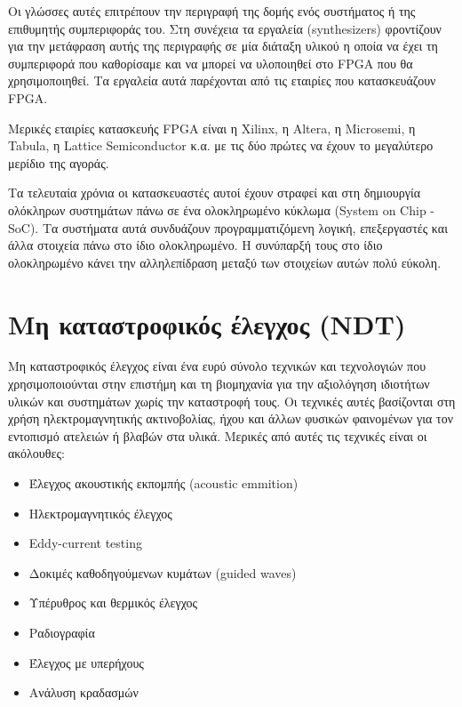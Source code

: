 \documentclass[12pt,a4paper]{book}
\begin{document}
Οι γλώσσες αυτές επιτρέπουν την περιγραφή της δομής ενός συστήματος ή της επιθυμητής συμπεριφοράς του. Στη συνέχεια τα εργαλεία (synthesizers) φροντίζουν για την μετάφραση αυτής της περιγραφής σε μία διάταξη υλικού η οποία να έχει τη συμπεριφορά που καθορίσαμε και να μπορεί να υλοποιηθεί στο FPGA που θα χρησιμοποιηθεί. Τα εργαλεία αυτά παρέχονται από τις εταιρίες που κατασκευάζουν FPGA.

Μερικές εταιρίες κατασκευής FPGA είναι η Xilinx, η Altera, η Microsemi, η Tabula, η Lattice Semiconductor κ.α. με τις δύο πρώτες να έχουν το μεγαλύτερο μερίδιο της αγοράς.

Τα τελευταία χρόνια οι κατασκευαστές αυτοί έχουν στραφεί και στη δημιουργία ολόκληρων συστημάτων πάνω σε ένα ολοκληρωμένο κύκλωμα (System on Chip - SoC). Τα συστήματα αυτά συνδυάζουν προγραμματιζόμενη λογική, επεξεργαστές και άλλα στοιχεία πάνω στο ίδιο ολοκληρωμένο. Η συνύπαρξή τους στο ίδιο ολοκληρωμένο κάνει την αλληλεπίδραση μεταξύ των στοιχείων αυτών πολύ εύκολη.



\section{Μη καταστροφικός έλεγχος (NDT)}
Μη καταστροφικός έλεγχος είναι ένα ευρύ σύνολο τεχνικών και τεχνολογιών που χρησιμοποιούνται στην επιστήμη και τη βιομηχανία για την αξιολόγηση ιδιοτήτων υλικών και συστημάτων χωρίς την καταστροφή τους. Οι τεχνικές αυτές βασίζονται στη χρήση ηλεκτρομαγνητικής ακτινοβολίας, ήχου και άλλων φυσικών φαινομένων για τον εντοπισμό ατελειών ή βλαβών στα υλικά. Μερικές από αυτές τις τεχνικές είναι οι ακόλουθες:
\begin{itemize}
\item Έλεγχος ακουστικής εκπομπής (acoustic emmition)
\item Ηλεκτρομαγνητικός έλεγχος
\item Eddy-current testing
\item Δοκιμές καθοδηγούμενων κυμάτων (guided waves)
\item Υπέρυθρος και θερμικός έλεγχος
\item Ραδιογραφία
\item Έλεγχος με υπερήχους
\item Ανάλυση κραδασμών
\end{itemize}
\end{document}
